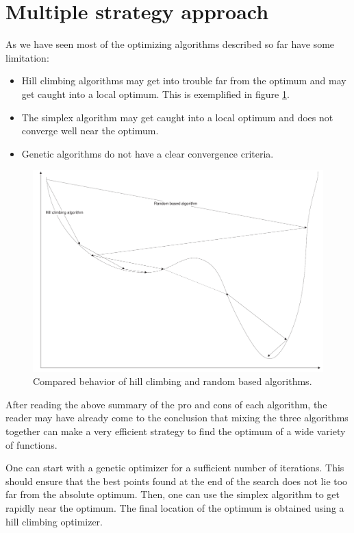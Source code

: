 \section{Multiple strategy approach}
\label{sec:multistrategy} As we have seen most of the optimizing
algorithms described so far have some limitation:
\begin{itemize}
  \item Hill climbing algorithms may get into trouble far from the
  optimum and may get caught into a local optimum. This is exemplified in figure \ref{fig:hillvsrandom}.
  \item The simplex algorithm may get caught into a local optimum
  and does not converge well near the optimum.
  \item Genetic algorithms do not have a clear convergence
  criteria.
\end{itemize}
\begin{figure}
\centering\includegraphics[width=12cm]{Figures/OptimizingComparisonvsd}
\caption{Compared behavior of hill climbing and random based algorithms.}\label{fig:hillvsrandom}
\end{figure}
After reading the above summary of the pro and cons of each
algorithm, the reader may have already come to the conclusion that
mixing the three algorithms together can make a very efficient
strategy to find the optimum of a wide variety of functions.

One can start with a genetic optimizer for a sufficient number of
iterations. This should ensure that the best points found at the
end of the search does not lie too far from the absolute optimum.
Then, one can use the simplex algorithm to get rapidly near the
optimum. The final location of the optimum is obtained using a
hill climbing optimizer.

